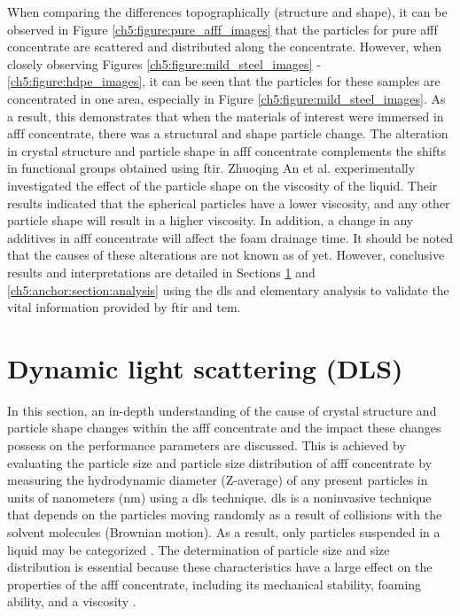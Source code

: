 When comparing the differences topographically (structure and shape), it can be observed in Figure \ref{ch5:figure:pure_afff_images} that the particles for pure \acrshort{afff} concentrate are scattered and distributed along the concentrate. However, when closely observing Figures \ref{ch5:figure:mild_steel_images} - \ref{ch5:figure:hdpe_images}, it can be seen that the particles for these samples are concentrated in one area, especially in Figure \ref{ch5:figure:mild_steel_images}. As a result, this demonstrates that when the materials of interest were immersed in \acrshort{afff} concentrate, there was a structural and shape particle change. The alteration in crystal structure and particle shape in \acrshort{afff} concentrate complements the shifts in functional groups obtained using \acrshort{ftir}. Zhuoqing An et al. \cite{an2018effect} experimentally investigated the effect of the particle shape on the viscosity of the liquid. Their results indicated that the spherical particles have a lower viscosity, and any other particle shape will result in a higher viscosity. In addition, a change in any additives in \acrshort{afff} concentrate will affect the foam drainage time. It should be noted that the causes of these alterations are not known as of yet. However, conclusive results and interpretations are detailed in Sections \ref{ch5:anchor:section:dls} and \ref{ch5:anchor:section:analysis} using the \acrshort{dls} and elementary analysis to validate the vital information provided by \acrshort{ftir} and \acrshort{tem}.

\section{Dynamic light scattering (DLS)}
\label{ch5:anchor:section:dls}
In this section, an in-depth understanding of the cause of crystal structure and particle shape changes within the \acrshort{afff} concentrate and the impact these changes possess on the performance parameters are discussed. This is achieved by evaluating the particle size and particle size distribution of \acrshort{afff} concentrate by measuring the hydrodynamic diameter (Z-average) of any present particles in units of nanometers (nm) using a \acrshort{dls} technique. \acrshort{dls} is a noninvasive technique that depends on the particles moving randomly as a result of collisions with the solvent molecules (Brownian motion). As a result, only particles suspended in a liquid may be categorized \cite{machhi2021effect}. The determination of particle size and size distribution is essential because these characteristics have a large effect on the properties of the \acrshort{afff} concentrate, including its mechanical stability, foaming ability, and a viscosity \cite{de2017detection}.

